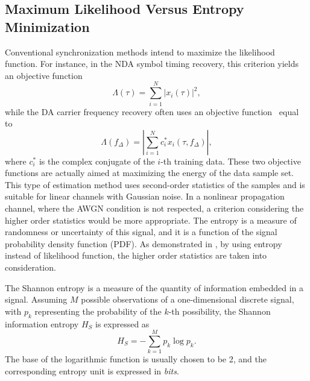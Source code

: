 \documentclass[journal,comsoc,onecolumn, 12pt,draftclsnofoot]{IEEEtran}
\begin{document}
\subsection{Maximum Likelihood Versus Entropy Minimization}
Conventional synchronization methods intend to maximize the likelihood function.
For instance, in the NDA symbol timing recovery, this criterion yields an objective function~\cite{mengali1997synchronization}
\begin{equation}
\Lambda(\tau) =\sum\limits_{i = 1}^N {{{\left| {{x_i}( \tau )} \right|}^2}}, 
\end{equation}
while the DA carrier frequency recovery often uses an objective function~\cite{mengali1997synchronization} equal to
\begin{equation}
\Lambda ({f_\Delta })=\left| \sum\limits_{i = 1}^N {{{{c_i^*{x_i}(\tau ,{f_\Delta })}}}} \right|, 
\end{equation}
where \(c_i^*\) is the complex conjugate of the \(i\)-th training data.
These two objective functions are actually aimed at maximizing the energy of the data sample set.
This type of estimation method uses second-order statistics of the samples and is suitable for linear channels with Gaussian noise.
In a nonlinear propagation channel, where the AWGN condition is not respected, a criterion considering the higher order statistics would be more appropriate.
The entropy is a measure of randomness or uncertainty of this signal, and it is a function of the signal probability density function (PDF).
As demonstrated in \cite{Santamaria2002}, by using entropy instead of likelihood function, the higher order statistics are taken into consideration.

The Shannon entropy is a measure of the quantity of information  embedded in a signal.
Assuming \(M\) possible observations of a one-dimensional discrete signal, with \(p_k\) representing the probability of the \(k\)-th possibility, the Shannon information entropy \(H_S\) is expressed as \cite{Shannon1948}
\begin{equation}
H_S =  - \sum\limits_{k = 1}^M {{p_k}\log {p_k}}.
\label{eq:entropy}
\end{equation}
The base of the logarithmic function is usually chosen to be 2, and the corresponding entropy unit is expressed in \textit{bits}.
\end{document}
